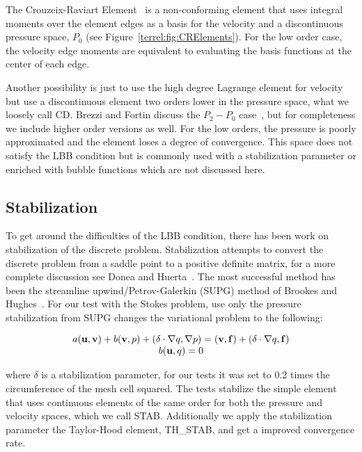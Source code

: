 The Crouzeix-Raviart Element~\cite{CrouzeixRaviart1973} is a non-conforming element that uses
integral moments over the element edges as a basis for the velocity and a
discontinuous pressure space, $P_0$ (see Figure~\ref{terrel:fig:CRElements}).  For the
low order case, the velocity edge moments are equivalent to evaluating the
basis functions at the center of each edge.

Another possibility is just to use the high degree Lagrange element for
velocity but use a discontinuous element two orders lower in the pressure
space, what we loosely call CD.  Brezzi and Fortin discuss the $P_2-P_0$
case~\cite{BrezziFortin1991}, but for completeness we include higher order versions
as well.  For the low orders, the pressure is poorly approximated and the
element loses a degree of convergence.  This space does not satisfy the LBB
condition but is commonly used with a stabilization parameter or enriched with
bubble functions which are not discussed here.

\subsection{Stabilization}

To get around the difficulties of the LBB condition, there has been work on
stabilization of the discrete problem.  Stabilization attempts to convert the
discrete problem from a saddle point to a positive definite matrix, for a more
complete discussion see Donea and Huerta~\cite{DoneaHuerta2003}.  The most
successful method has been the streamline upwind/Petrov-Galerkin (SUPG) method
of Brookes and Hughes~\cite{BrooksHughes1982}.  For our test with the Stokes problem, use
only the pressure stabilization from SUPG changes the variational problem to the following:

\begin{equation*}
\label{terrel:eqn:StabilizedStokes}
\begin{array}{c}
  a({\bf u},{\bf v})+b({\bf v},p) + (\delta\cdot\nabla{q},\nabla{p})  =  ({\bf v},
  {\bf f}) + (\delta\cdot\nabla{q}, \bf f)\\
  b({\bf u},q) = 0
  \end{array}
\end{equation*}

where $\delta$ is a stabilization parameter, for our tests it was set to 0.2
times the circumference of the mesh cell squared.  The tests stabilize the
simple element that uses continuous elements of the same order for both the
pressure and velocity spaces, which we call STAB.  Additionally we apply the
stabilization parameter the Taylor-Hood element, TH\_STAB, and get a improved convergence
rate.

